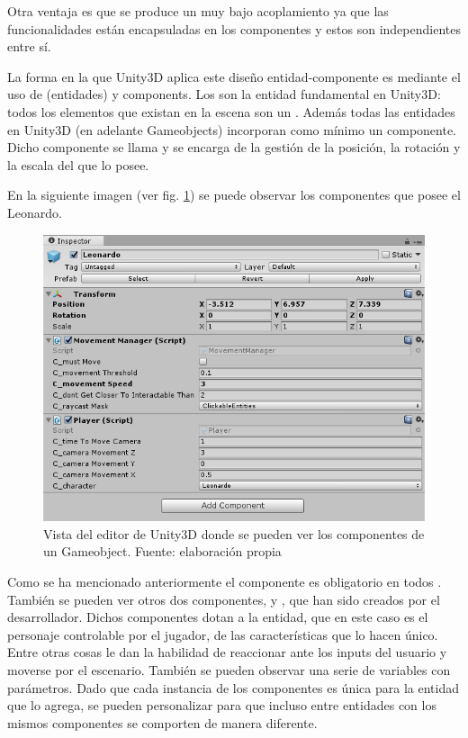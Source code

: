 Otra ventaja es que se produce un muy bajo acoplamiento ya que las funcionalidades están encapsuladas en los componentes y estos son independientes entre sí.

La forma en la que Unity3D aplica este diseño entidad-componente es mediante el uso de  (entidades) y components.
Los  son la entidad fundamental en Unity3D: todos los elementos que existan en la escena son un . Además todas las entidades en Unity3D (en adelante Gameobjects) incorporan como mínimo un componente. Dicho componente se llama  y se encarga de la gestión de la posición, la rotación y la escala del  que lo posee.

En la siguiente imagen (ver fig. \ref{gameobjectComponents}) se puede observar los componentes que posee el  Leonardo. 

\begin{figure}
\begin{center}
\includegraphics[scale=0.9]{imagenes/GameobjectsAndComponents.png}
\caption{Vista del editor de Unity3D donde se pueden ver los componentes de un Gameobject.  Fuente: elaboración propia}
\label{gameobjectComponents}
\end{center}
\end{figure}

Como se ha mencionado anteriormente el componente  es obligatorio en todos . También se pueden ver otros dos componentes,  y , que han sido creados por el desarrollador.
Dichos componentes dotan a la entidad, que en este caso es el personaje controlable por el jugador, de las características que lo hacen único. Entre otras cosas le dan la habilidad de reaccionar ante los inputs del usuario y moverse por el escenario. También se pueden observar una serie de variables con parámetros. Dado que cada instancia de los componentes es única para la entidad que lo agrega, se pueden personalizar para que incluso entre entidades con los mismos componentes se comporten de manera diferente.

